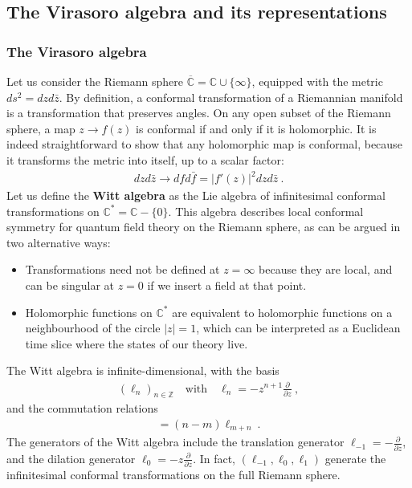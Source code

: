 \documentclass[12pt, a4paper]{article}
\theoremstyle{break}
\begin{document}
\subsection{The Virasoro algebra and its representations}

\subsubsection{The Virasoro algebra}

Let us consider the Riemann sphere $\overline{\mathbb{C}}=\mathbb{C}\cup \{\infty\}$, equipped with the metric $ds^2 = dzd\bar z$. By definition, a conformal transformation of a Riemannian manifold is a transformation that preserves angles. On any open subset of the Riemann sphere, a map $z\to f(z)$ is conformal if and only if it is holomorphic. It is indeed straightforward to show that any holomorphic map is conformal,
because it transforms the metric into itself, up to a scalar factor: 
\begin{align}
 dzd\bar z\to dfd\bar f = |f'(z)|^2 dzd\bar z\ .
\end{align}
Let us define the \textbf{Witt algebra} as the Lie algebra of infinitesimal conformal transformations on $\mathbb{C}^*= \mathbb{C}-\{0\}$. This algebra describes local conformal symmetry for quantum field theory on the Riemann sphere, as can be argued in two alternative ways:
\begin{itemize}
 \item Transformations need not be defined at $z=\infty$ because they are local, and can be singular at $z=0$ if we insert a field at that point.
 \item Holomorphic functions on $\mathbb{C}^*$ are equivalent to holomorphic functions on a neighbourhood of the circle $|z|=1$, which can be interpreted as a Euclidean time slice where the states of our theory live. 
\end{itemize}
The Witt algebra is infinite-dimensional, with the basis 
\begin{align}
 \left(\ell_n\right)_{n\in\mathbb{Z}}  \quad \text{with} \quad \ell_n = -z^{n+1}\frac{\partial}{\partial z}\ ,
 \label{lpz}
\end{align}
and the commutation relations 
\begin{align}
 [\ell_n,\ell_m] = (n-m)\ell_{m+n}\ .
\end{align}
The generators of the Witt algebra include the translation generator $\ell_{-1} = -\frac{\partial}{\partial z}$, and the dilation generator $\ell_0 = -z\frac{\partial}{\partial z}$. In fact, $(\ell_{-1},\ell_0,\ell_1)$ generate the infinitesimal conformal transformations on the full Riemann sphere.
\end{document}
